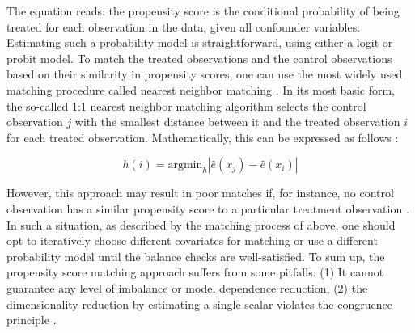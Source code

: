 The equation reads: the propensity score is the conditional probability of being treated for each observation in the data, given all confounder variables. Estimating such a probability model is straightforward, using either a logit or probit model. To match the treated observations and the control observations based on their similarity in propensity scores, one can use the most widely used matching procedure called nearest neighbor matching \citep[p. 604]{bekes2021data}. In its most basic form, the so-called 1:1 nearest neighbor matching algorithm selects the control observation $j$ with the smallest distance between it and the treated observation $i$ for each treated observation. Mathematically, this can be expressed as follows \citep[p. 936]{wooldridge2010econometric}:

\begin{equation}
    h(i) = \text{argmin}_h |\hat{e}(x_j)-\hat{e}(x_i)|
\end{equation}


However, this approach may result in poor matches if, for instance, no control observation has a similar propensity score to a particular treatment observation \citep[p. 10]{stuart2010matching}. In such a situation, as described by the matching process of \citet{stuart2010matching} above, one should opt to iteratively choose different covariates for matching or use a different probability model until the balance checks are well-satisfied. 
To sum up, the propensity score matching approach suffers from some pitfalls: (1) It cannot guarantee any level of imbalance or model dependence reduction, (2) the dimensionality reduction by estimating a single scalar violates the congruence principle \citep[p. 2]{iacus2012causal}.

